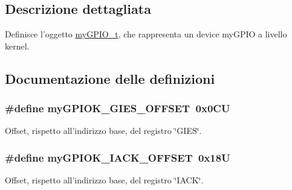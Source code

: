 \subsection{Descrizione dettagliata}
Definisce l'oggetto \hyperlink{structmy_g_p_i_o__t}{my\+G\+P\+I\+O\+\_\+t}, che rappresenta un device my\+G\+P\+I\+O a livello kernel. 



\subsection{Documentazione delle definizioni}
\hypertarget{group__my_g_p_i_o_k__t_ga0da2526ca3cd1a94ebcecf96778ea2e5}{
\subsubsection[{my\+G\+P\+I\+O\+K\+\_\+\+G\+I\+E\+S\+\_\+\+O\+F\+F\+S\+E\+T}]{\setlength{\rightskip}{0pt plus 5cm}\#define my\+G\+P\+I\+O\+K\+\_\+\+G\+I\+E\+S\+\_\+\+O\+F\+F\+S\+E\+T~0x0\+C\+U}}\label{group__my_g_p_i_o_k__t_ga0da2526ca3cd1a94ebcecf96778ea2e5}


Offset, rispetto all'indirizzo base, del registro \char`\"{}\+G\+I\+E\+S\char`\"{}. 

\hypertarget{group__my_g_p_i_o_k__t_gac72408c288009c213c0231973b3fe761}{
\subsubsection[{my\+G\+P\+I\+O\+K\+\_\+\+I\+A\+C\+K\+\_\+\+O\+F\+F\+S\+E\+T}]{\setlength{\rightskip}{0pt plus 5cm}\#define my\+G\+P\+I\+O\+K\+\_\+\+I\+A\+C\+K\+\_\+\+O\+F\+F\+S\+E\+T~0x18\+U}}\label{group__my_g_p_i_o_k__t_gac72408c288009c213c0231973b3fe761}


Offset, rispetto all'indirizzo base, del registro \char`\"{}\+I\+A\+C\+K\char`\"{}. 

